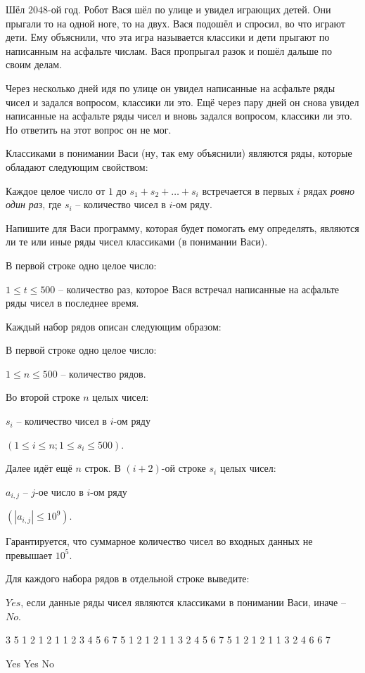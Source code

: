 
Шёл $2048$-ой год. Робот Вася шёл по улице и увидел играющих детей. Они прыгали то на одной ноге, то на двух. Вася подошёл и спросил, во что играют дети. Ему объяснили, что эта игра называется классики и дети прыгают по написанным на асфальте числам. Вася пропрыгал разок и пошёл дальше по своим делам.

Через несколько дней идя по улице он увидел написанные на асфальте ряды чисел и задался вопросом, классики ли это. Ещё через пару дней он снова увидел написанные на асфальте ряды чисел и вновь задался вопросом, классики ли это. Но ответить на этот вопрос он не мог.

Классиками в понимании Васи (ну, так ему объяснили) являются ряды, которые обладают следующим свойством:

Каждое целое число от $1$ до $s_{1} + s_{2} + \ldots + s_{i}$ встречается в первых $i$ рядах \emph{ровно один раз}, где $s_{i}$ -- количество чисел в $i$-ом ряду.

Напишите для Васи программу, которая будет помогать ему определять, являются ли те или иные ряды чисел классиками (в понимании Васи).


В первой строке одно целое число:

$1 \le t \le 500$ -- количество раз, которое Вася встречал написанные на асфальте ряды чисел в последнее время.

Каждый набор рядов описан следующим образом:

В первой строке одно целое число:

$1 \le n \le 500$ -- количество рядов.

Во второй строке $n$ целых чисел:

$s_{i}$ -- количество чисел в $i$-ом ряду

$(1 \le i \le n; 1 \le s_{i} \le 500)$.

Далее идёт ещё $n$ строк. В $(i+2)$-ой строке $s_{i}$ целых чисел:

$a_{i,j}$ -- $j$-ое число в $i$-ом ряду

$(|a_{i,j}| \le 10^9)$.

Гарантируется, что суммарное количество чисел во входных данных не превышает $10^5$.

\outputfmtSection

Для каждого набора рядов в отдельной строке выведите: 

$Yes$, если данные ряды чисел являются классиками в понимании Васи, иначе -- $No$.

\exampleSection


\begin{myverbbox}[\small]{\vinput}
3
5
1 2 1 2 1
1
2 3
4
5 6
7
5
1 2 1 2 1
1
3 2
4
5 6
7
5
1 2 1 2 1
1
3 2
4
6 6
7
\end{myverbbox}
\begin{myverbbox}[\small]{\voutput}
Yes
Yes
No
\end{myverbbox}

